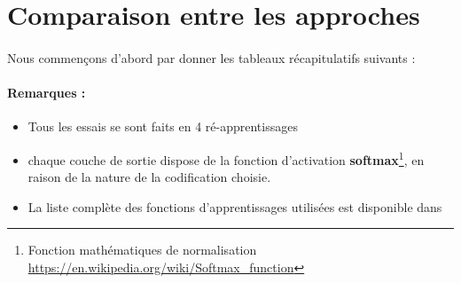 \newpage
\section{Comparaison entre les approches}
\paragraph{}Nous commençons d'abord par donner les tableaux récapitulatifs suivants :
\paragraph{Remarques : }
\begin{itemize}
	\item Tous les essais se sont faits en 4 ré-apprentissages 
	\item chaque couche de sortie dispose de la fonction d'activation \textbf{softmax}\footnote{Fonction mathématiques de normalisation \url{https://en.wikipedia.org/wiki/Softmax_function}}, en raison de la nature de la codification choisie.
	\item La liste complète des fonctions d'apprentissages utilisées est disponible dans \cite{KerasOpt}
\end{itemize}
\begin{table}[H]
	
	\centering
	\caption{Meilleures architectures sur les données de teste pour l'approche naïve (\ref{naiveApproache}) avec partitionnement aléatoire(\ref{randomPartLearning})}
\end{table}

